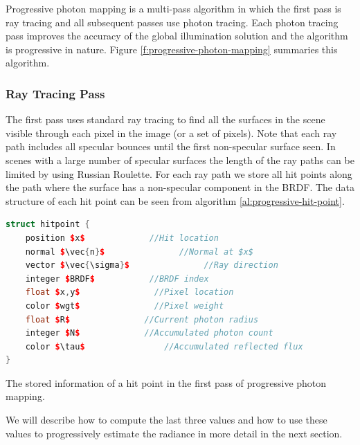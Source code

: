 Progressive photon mapping is a multi-pass algorithm in which the first pass is ray tracing and all subsequent passes use photon tracing. Each photon tracing pass improves the accuracy of the global illumination solution and the algorithm is progressive in nature. Figure \ref{f:progressive-photon-mapping} summaries this algorithm.




\subsubsection{Ray Tracing Pass}
The first pass uses standard ray tracing to find all the surfaces in the scene visible through each pixel in the image (or a set of pixels). Note that each ray path includes all specular bounces until the first non-specular surface seen. In scenes with a large number of specular surfaces the length of the ray paths can be limited by using Russian Roulette. For each ray path we store all hit points along the path where the surface has a non-specular component in the BRDF. The data structure of each hit point can be seen from algorithm \ref{al:progressive-hit-point}.

\begin{algorithm}\label{al:progressive-hit-point}
\begin{lstlisting}[language=C++, mathescape]
struct hitpoint {
	position $x$             //Hit location
	normal $\vec{n}$               //Normal at $x$
	vector $\vec{\sigma}$               //Ray direction
	integer $BRDF$           //BRDF index
	float $x,y$               //Pixel location
	color $wgt$               //Pixel weight
	float $R$               //Current photon radius 
	integer $N$             //Accumulated photon count 
	color $\tau$                //Accumulated reflected flux
}
\end{lstlisting}	
\caption{The stored information of a hit point in the first pass of progressive photon mapping.}
\end{algorithm}

We will describe how to compute the last three values and how to use these values to progressively estimate the radiance in more detail in the next section.

